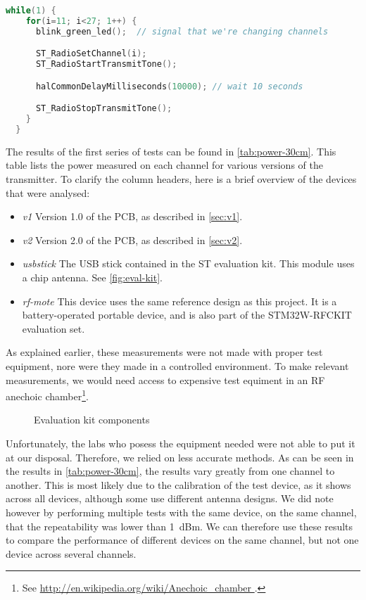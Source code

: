 \begin{lstlisting}[language=C,caption=Tone generation code]
  while(1) {
    for(i=11; i<27; 1++) {
      blink_green_led();  // signal that we're changing channels

      ST_RadioSetChannel(i);
      ST_RadioStartTransmitTone();

      halCommonDelayMilliseconds(10000); // wait 10 seconds

      ST_RadioStopTransmitTone();
    }
  }
\end{lstlisting}

The results of the first series of tests can be found in
\autoref{tab:power-30cm}. This table lists the power measured on each channel
for various versions of the transmitter. To clarify the column headers, here is
a brief overview of the devices that were analysed:

\begin{itemize}
  \item \emph{v1} Version 1.0 of the PCB, as described in \autoref{sec:v1}.
  \item \emph{v2} Version 2.0 of the PCB, as described in \autoref{sec:v2}.
  \item \emph{usbstick} The USB stick contained in the ST evaluation kit. This
    module uses a chip antenna. See \autoref{fig:eval-kit}.
  \item \emph{rf-mote} This device uses the same reference design as this
    project. It is a battery-operated portable device, and is also part of the
    STM32W-RFCKIT evaluation set.
\end{itemize}

As explained earlier, these measurements were not made with proper test
equipment, nore were they made in a controlled environment. To make relevant
measurements, we would need access to expensive test equiment in an RF anechoic
chamber\footnote{ See \url{ http://en.wikipedia.org/wiki/Anechoic_chamber }.}.

\begin{figure}[bth]
  \caption{Evaluation kit components}
  \label{fig:eval-kit}
\end{figure}

Unfortunately, the labs who posess the equipment needed were not able to put it
at our disposal. Therefore, we relied on less accurate methods. As can be seen
in the results in \autoref{tab:power-30cm}, the results vary greatly from one
channel to another. This is most likely due to the calibration of the test
device, as it shows across all devices, although some use different antenna
designs. We did note however by performing multiple tests with the same device,
on the same channel, that the repeatability was lower than \SI{1}{dBm}. We can
therefore use these results to compare the performance of different devices on
the same channel, but not one device across several channels.

